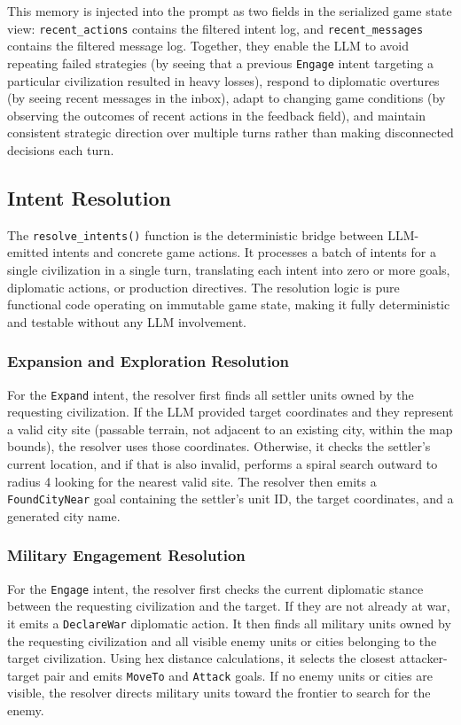 \documentclass[conference]{IEEEtran}
\begin{document}
This memory is injected into the prompt as two fields in the serialized game state view: \texttt{recent\_actions} contains the filtered intent log, and \texttt{recent\_messages} contains the filtered message log. Together, they enable the LLM to avoid repeating failed strategies (by seeing that a previous \texttt{Engage} intent targeting a particular civilization resulted in heavy losses), respond to diplomatic overtures (by seeing recent messages in the inbox), adapt to changing game conditions (by observing the outcomes of recent actions in the feedback field), and maintain consistent strategic direction over multiple turns rather than making disconnected decisions each turn.

\subsection{Intent Resolution}

The \texttt{resolve\_intents()} function is the deterministic bridge between LLM-emitted intents and concrete game actions. It processes a batch of intents for a single civilization in a single turn, translating each intent into zero or more goals, diplomatic actions, or production directives. The resolution logic is pure functional code operating on immutable game state, making it fully deterministic and testable without any LLM involvement.

\subsubsection{Expansion and Exploration Resolution}

For the \texttt{Expand} intent, the resolver first finds all settler units owned by the requesting civilization. If the LLM provided target coordinates and they represent a valid city site (passable terrain, not adjacent to an existing city, within the map bounds), the resolver uses those coordinates. Otherwise, it checks the settler's current location, and if that is also invalid, performs a spiral search outward to radius 4 looking for the nearest valid site. The resolver then emits a \texttt{FoundCityNear} goal containing the settler's unit ID, the target coordinates, and a generated city name.

\subsubsection{Military Engagement Resolution}

For the \texttt{Engage} intent, the resolver first checks the current diplomatic stance between the requesting civilization and the target. If they are not already at war, it emits a \texttt{DeclareWar} diplomatic action. It then finds all military units owned by the requesting civilization and all visible enemy units or cities belonging to the target civilization. Using hex distance calculations, it selects the closest attacker-target pair and emits \texttt{MoveTo} and \texttt{Attack} goals. If no enemy units or cities are visible, the resolver directs military units toward the frontier to search for the enemy.
\end{document}
